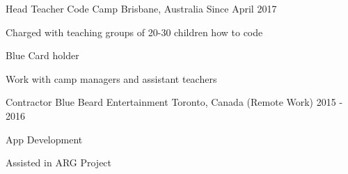 


\begin{cventries}


\cventry
{Head Teacher} %
{Code Camp} %
{Brisbane, Australia} %
{Since April 2017} %
{ %
\begin{cvitems}
\item {Charged with teaching groups of 20-30 children how to code}
\item {Blue Card holder}
\item {Work with camp managers and assistant teachers}
\end{cvitems}
}


\cventry
{Contractor} %
{Blue Beard Entertainment} %
{Toronto, Canada (Remote Work)} %
{2015 - 2016} %
{ %
\begin{cvitems}
\item {App Development}
\item {Assisted in ARG Project} %
\end{cvitems}
}


\end{cventries}